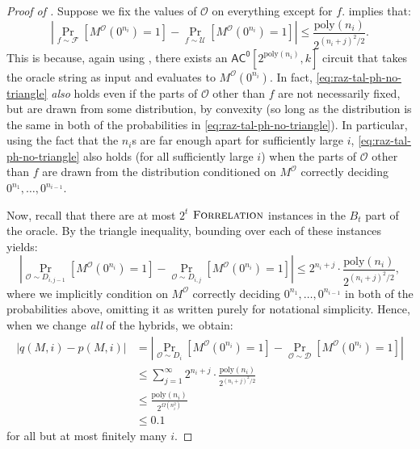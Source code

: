 \documentclass[10pt,a4paper]{article}
\newcommand{\poly}{\mathrm{poly}}
\newcommand{\Forrelation}{\normalfont\textsc{Forrelation}}
\begin{document}
\begin{proof}[Proof of ]
Suppose we fix the values of $\mathcal{O}$ on everything except for $f$.  implies that:
\begin{equation}
\label{eq:raz-tal-ph-no-triangle}
\left|\Pr_{f \sim \mathcal{F}}\left[M^\mathcal{O}\left(0^{n_i}\right) = 1\right]-\Pr_{f \sim \mathcal{U}}\left[M^\mathcal{O}\left(0^{n_i}\right) = 1 \right]\right| \le \frac{\poly(n_i)}{2^{(n_i+j)^2/2}}.
\end{equation}
This is because, again using , there exists an $\mathsf{AC^0}\left[2^{\poly(n_i)} , k\right]$ circuit that takes the oracle string as input and evaluates to $M^\mathcal{O}\left(0^{n_i}\right)$. In fact, \eqref{eq:raz-tal-ph-no-triangle} \textit{also} holds even if the parts of $\mathcal{O}$ other than $f$ are not necessarily fixed, but are drawn from some distribution, by convexity (so long as the distribution is the same in both of the probabilities in \eqref{eq:raz-tal-ph-no-triangle}). In particular, using the fact that the $n_i$s are far enough apart for sufficiently large $i$, \eqref{eq:raz-tal-ph-no-triangle} also holds (for all sufficiently large $i$) when the parts of $\mathcal{O}$ other than $f$ are drawn from the distribution conditioned on $M^\mathcal{O}$ correctly deciding $0^{n_1},\dots,0^{n_{i-1}}$.

Now, recall that there are at most $2^{t}$ $\Forrelation$ instances in the $B_t$ part of the oracle. By the triangle inequality, bounding over each of these instances yields:
\[
\left|\Pr_{\mathcal{O} \sim D_{i, j-1}}\left[M^\mathcal{O}\left(0^{n_i}\right) = 1\right]-\Pr_{\mathcal{O} \sim D_{i, j}}\left[M^\mathcal{O}\left(0^{n_i}\right) = 1 \right]\right| \le 2^{n_i + j} \cdot \frac{\poly(n_i)}{2^{(n_i+j)^2/2}},
\]
where we implicitly condition on $M^\mathcal{O}$ correctly deciding $0^{n_1},\dots,0^{n_{i-1}}$ in both of the probabilities above, omitting it as written purely for notational simplicity. Hence, when we change \textit{all} of the hybrids, we obtain:
\begin{align*}
|q(M, i) - p(M, i)| &= \left|\Pr_{\mathcal{O} \sim D_i}\left[M^\mathcal{O}\left(0^{n_i}\right) = 1\right]-\Pr_{\mathcal{O} \sim \mathcal{D}}\left[M^\mathcal{O}\left(0^{n_i}\right) = 1 \right]\right|\\
&\le \sum_{j=1}^\infty 2^{n_i + j} \cdot \frac{\poly(n_i)}{2^{(n_i + j)^2 / 2}}\\
&\le \frac{\poly(n_i)}{2^{\Omega\left(n_i^2\right)}}\\
&\le 0.1
\end{align*}
for all but at most finitely many $i$.
\end{proof}
\end{document}
